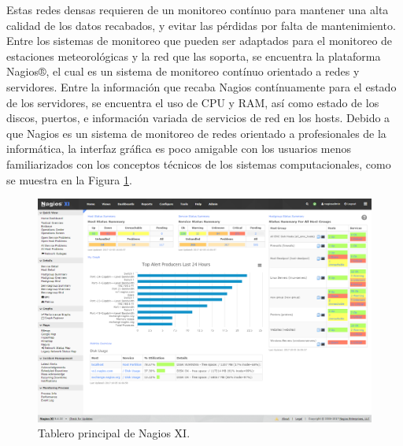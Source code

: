 




Estas redes densas requieren de un monitoreo contínuo para mantener una alta calidad de los datos recabados, y evitar las pérdidas por falta de mantenimiento. Entre los sistemas de monitoreo que pueden ser adaptados para el monitoreo de estaciones meteorológicas y la red que las soporta, se encuentra la plataforma Nagios®, el cual es un sistema de monitoreo contínuo orientado a redes y servidores. Entre la información que recaba Nagios contínuamente para el estado de los servidores, se encuentra el uso de CPU y RAM, así como estado de los discos, puertos, e información variada de servicios de red en los hosts. Debido a que Nagios es un sistema de monitoreo de redes orientado a profesionales de la informática, la interfaz gráfica es poco amigable con los usuarios menos familiarizados con los conceptos técnicos de los sistemas computacionales, como se muestra en la Figura \ref{fig:nagios_dashboard}.

\begin{figure}[!ht]
	\centering
	\includegraphics[width=.80\linewidth]{images/Nagios_home_dashboard.png}
	\caption{Tablero principal de Nagios XI.}
	\label{fig:nagios_dashboard}
\end{figure}

